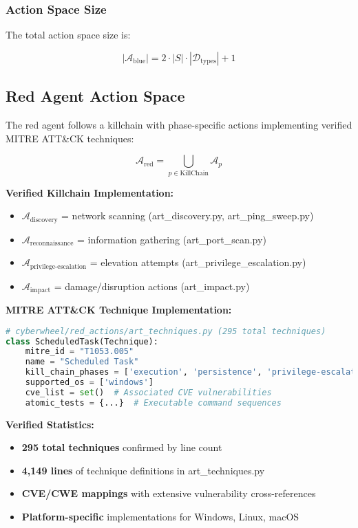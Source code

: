 \documentclass[12pt,a4paper]{article}
\begin{document}
\subsubsection{Action Space Size}
The total action space size is:

\begin{equation}
|\mathcal{A}_{\text{blue}}| = 2 \cdot |S| \cdot |\mathcal{D}_{\text{types}}| + 1
\end{equation}

\subsection{Red Agent Action Space}
The red agent follows a killchain with phase-specific actions implementing verified MITRE ATT\&CK techniques:

\begin{equation}
\mathcal{A}_{\text{red}} = \bigcup_{p \in \text{KillChain}} \mathcal{A}_p
\end{equation}

\textbf{Verified Killchain Implementation:}
\begin{itemize}
    \item $\mathcal{A}_{\text{discovery}}$ = network scanning (art\_discovery.py, art\_ping\_sweep.py)
    \item $\mathcal{A}_{\text{reconnaissance}}$ = information gathering (art\_port\_scan.py)
    \item $\mathcal{A}_{\text{privilege-escalation}}$ = elevation attempts (art\_privilege\_escalation.py)  
    \item $\mathcal{A}_{\text{impact}}$ = damage/disruption actions (art\_impact.py)
\end{itemize}

\textbf{MITRE ATT\&CK Technique Implementation:}
\begin{lstlisting}[language=Python, caption=MITRE Technique Example (Verified)]
# cyberwheel/red_actions/art_techniques.py (295 total techniques)
class ScheduledTask(Technique):
    mitre_id = "T1053.005"
    name = "Scheduled Task"
    kill_chain_phases = ['execution', 'persistence', 'privilege-escalation']
    supported_os = ['windows']
    cve_list = set()  # Associated CVE vulnerabilities
    atomic_tests = {...}  # Executable command sequences
\end{lstlisting}

\textbf{Verified Statistics:}
\begin{itemize}
    \item \textbf{295 total techniques} confirmed by line count
    \item \textbf{4,149 lines} of technique definitions in art\_techniques.py
    \item \textbf{CVE/CWE mappings} with extensive vulnerability cross-references
    \item \textbf{Platform-specific} implementations for Windows, Linux, macOS
\end{itemize}
\end{document}
